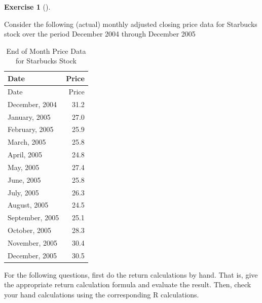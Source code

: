 \documentclass[
  letterpaper,
  DIV=11,
  numbers=noendperiod]{scrreprt}
\theoremstyle{definition}
\newtheorem{exercise}{Exercise}[chapter]
\theoremstyle{definition}
\theoremstyle{remark}
\begin{document}
\begin{exercise}[]\protect\hypertarget{exr-exercise0104}{}\label{exr-exercise0104}

Consider the following (actual) monthly adjusted closing price data for
Starbucks stock over the period December 2004 through December 2005

\begin{longtable}[]{@{}lr@{}}
\caption{End of Month Price Data for Starbucks Stock}\tabularnewline
\toprule\noalign{}
Date & Price \\
\midrule\noalign{}
\endfirsthead
\toprule\noalign{}
Date & Price \\
\midrule\noalign{}
\endhead
\bottomrule\noalign{}
\endlastfoot
December, 2004 & 31.2 \\
January, 2005 & 27.0 \\
February, 2005 & 25.9 \\
March, 2005 & 25.8 \\
April, 2005 & 24.8 \\
May, 2005 & 27.4 \\
June, 2005 & 25.8 \\
July, 2005 & 26.3 \\
August, 2005 & 24.5 \\
September, 2005 & 25.1 \\
October, 2005 & 28.3 \\
November, 2005 & 30.4 \\
December, 2005 & 30.5 \\
\end{longtable}

For the following questions, first do the return calculations by hand.
That is, give the appropriate return calculation formula and evaluate
the result. Then, check your hand calculations using the corresponding R
calculations.


\end{exercise}
\end{document}
